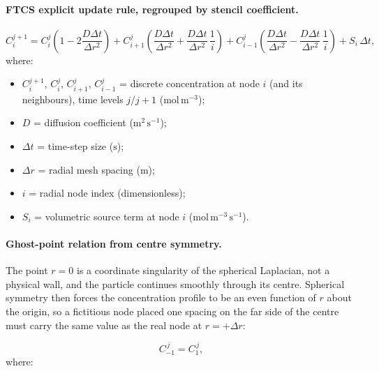 \documentclass[11pt,a4paper]{article}
\newcommand{\Cd}[2]{C_{#1}^{#2}}
\newcommand{\dr}{\Delta r}
\newcommand{\dt}{\Delta t}
\newcommand{\Diff}{D}
\begin{document}
\paragraph{FTCS explicit update rule, regrouped by stencil coefficient.}

\begin{equation}
  \Cd{i}{j+1}
  = \Cd{i}{j}\!\left( 1 - 2\frac{\Diff\dt}{\dr^{2}} \right)
  + \Cd{i+1}{j}\!\left( \frac{\Diff\dt}{\dr^{2}} + \frac{\Diff\dt}{\dr^{2}}\,\frac{1}{i} \right)
  + \Cd{i-1}{j}\!\left( \frac{\Diff\dt}{\dr^{2}} - \frac{\Diff\dt}{\dr^{2}}\,\frac{1}{i} \right)
  + S_i\,\dt ,
  \label{eq:explicit-coeffs}
\end{equation}
\vspace{-0.3em}
\noindent where:

\begin{itemize}[leftmargin=1.6em,itemsep=1pt,topsep=3pt,parsep=0pt]
  \item $C_i^{j+1},\,C_i^{j},\,C_{i+1}^{j},\,C_{i-1}^{j}$ = discrete concentration at node $i$ (and its neighbours), time levels $j$/$j{+}1$ ($\mathrm{mol\,m^{-3}}$);
  \item $D$ = diffusion coefficient ($\mathrm{m^{2}\,s^{-1}}$);
  \item $\Delta t$ = time-step size ($\mathrm{s}$);
  \item $\Delta r$ = radial mesh spacing ($\mathrm{m}$);
  \item $i$ = radial node index (dimensionless);
  \item $S_i$ = volumetric source term at node $i$ ($\mathrm{mol\,m^{-3}\,s^{-1}}$).
\end{itemize}


\paragraph{Ghost-point relation from centre symmetry.}
The point $r=0$ is a coordinate singularity of the spherical Laplacian, not a physical wall, and the particle continues smoothly through its centre. Spherical symmetry then forces the concentration profile to be an even function of $r$ about the origin, so a fictitious node placed one spacing on the far side of the centre must carry the same value as the real node at $r=+\dr$:

\begin{equation}
C_{-1}^{\,j} = C_{1}^{\,j},
\label{eq:centre-ghost}
\end{equation}
\vspace{-0.3em}
\noindent where:
\end{document}
